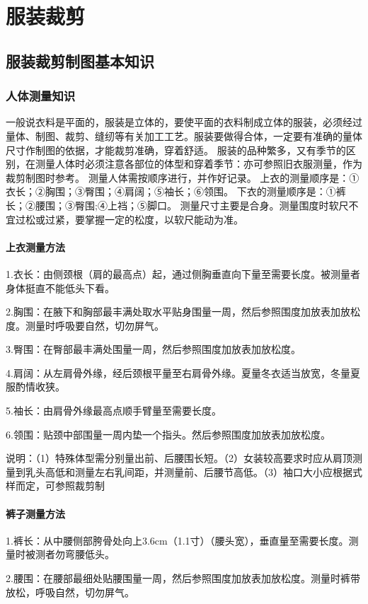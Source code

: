 \documentclass{ctexbook}
\begin{document}
\chapter{服装裁剪}
\section{服装裁剪制图基本知识}
\subsection{人体测量知识}
一般说衣料是平面的，服装是立体的，要使平面的衣料制成立体的服装，必须经过量体、制图、裁剪、缝纫等有关加工工艺。服装要做得合体，一定要有准确的量体尺寸作制图的依据，才能裁剪准确，穿着舒适。
服装的品种繁多，又有季节的区别，在测量人体时必须注意各部位的体型和穿着季节：亦可参照旧衣服测量，作为裁剪制图时参考。
测量人体需按顺序进行，并作好记录。
上衣的测量顺序是：①衣长；②胸围；③臀围；④肩阔；⑤袖长；⑥领围。
下衣的测量顺序是：①裤长；②腰围；③臀围;④上裆；⑤脚口。
测量尺寸主要是合身。测量围度时软尺不宜过松或过紧，要掌握一定的松度，以软尺能动为准。
\subsubsection{上衣测量方法}

1.衣长：由侧颈根（肩的最高点）起，通过侧胸垂直向下量至需要长度。被测量者身体挺直不能低头下看。

2.胸围：在腋下和胸部最丰满处取水平贴身围量一周，然后参照围度加放表加放松度。测量时呼吸要自然，切勿屏气。

3.臀围：在臀部最丰满处围量一周，然后参照围度加放表加放松度。

4.肩阔：从左肩骨外缘，经后颈根平量至右肩骨外缘。夏量冬衣适当放宽，冬量夏服酌情收狭。

5.袖长：由肩骨外缘最高点顺手臂量至需要长度。

6.领围：贴颈中部围量一周内垫一个指头。然后参照围度加放表加放松度。

说明：（1）特殊体型需分别量出前、后腰围长短。（2）女装较高要求时应从肩顶测量到乳头高低和测量左右乳间距，并测量前、后腰节高低。（3）袖口大小应根据式样而定，可参照裁剪制

\subsubsection{裤子测量方法}
1.裤长：从中腰侧部胯骨处向上3.6cm（1.1寸）（腰头宽），垂直量至需要长度。测量时被测者勿弯腰低头。

2.腰围：在腰部最细处贴腰围量一周，然后参照围度加放表加放松度。测量时裤带放松，呼吸自然，切勿屏气。
\end{document}

